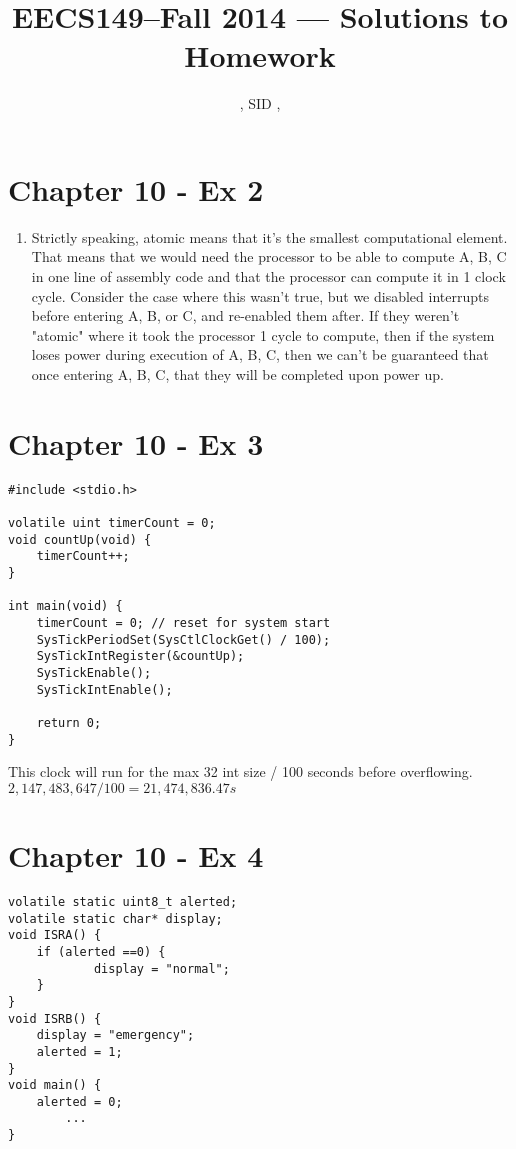\documentclass[11pt]{article}
\title{EECS149--Fall 2014 --- Solutions to Homework \Homework}
\author{\Name, SID \SID, \texttt{\Login}}
\newenvironment{qparts}{\begin{enumerate}[{(}a{)}]}{\end{enumerate}}
\begin{document}
\maketitle

\section*{Chapter 10 - Ex 2}
\begin{qparts}
\item
Strictly speaking, atomic means that it's the smallest computational element. That means that we would need the processor to be able to compute A, B, C in one line of assembly code and that the processor can compute it in 1 clock cycle. Consider the case where this wasn't true, but we disabled interrupts before entering A, B, or C, and re-enabled them after. If they weren't "atomic" where it took the processor 1 cycle to compute, then if the system loses power during execution of A, B, C, then we can't be guaranteed that once entering A, B, C, that they will be completed upon power up.
\end{qparts}



\section*{Chapter 10 - Ex 3}
\begin{lstlisting}[frame=single]
#include <stdio.h>

volatile uint timerCount = 0;
void countUp(void) {
	timerCount++;
}

int main(void) { 
	timerCount = 0; // reset for system start
	SysTickPeriodSet(SysCtlClockGet() / 100);
	SysTickIntRegister(&countUp);
	SysTickEnable();
	SysTickIntEnable();
	
	return 0;
}
\end{lstlisting}

\noindent This clock will run for the max 32 int size / 100 seconds before overflowing.\\
 $2,147,483,647/100 = 21,474,836.47 s$




\section*{Chapter 10 - Ex 4}
\begin{lstlisting}[frame=single]
volatile static uint8_t alerted;
volatile static char* display;
void ISRA() {
	if (alerted ==0) {
			display = "normal";
	}
}
void ISRB() {
	display = "emergency";
	alerted = 1;
}
void main() {
	alerted = 0;
		...
}
\end{lstlisting}
\end{document}
